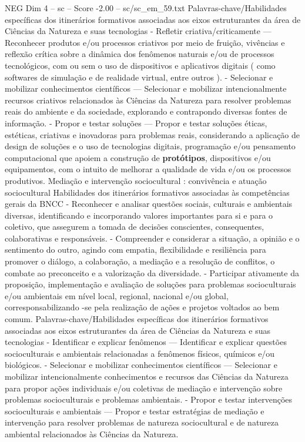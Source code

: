 \begin{textsample}{NEG Dim 4 – sc – Score -2.00 – sc/sc\_em\_59.txt}
Palavras-chave/Habilidades específicas dos itinerários formativos associadas aos eixos estruturantes da área de Ciências da Natureza e suas tecnologias - Refletir criativa/criticamente — Reconhecer produtos e/ou processos criativos por meio de fruição, vivências e reflexão crítica sobre a dinâmica dos fenômenos naturais e/ou de processos tecnológicos, com ou sem o uso de dispositivos e aplicativos digitais ( como softwares de simulação e de realidade virtual, entre outros ). - Selecionar e mobilizar conhecimentos científicos — Selecionar e mobilizar intencionalmente recursos criativos relacionados às Ciências da Natureza para resolver problemas reais do ambiente e da sociedade, explorando e contrapondo diversas fontes de informação. - Propor e testar soluções — Propor e testar soluções éticas, estéticas, criativas e inovadoras para problemas reais, considerando a aplicação de design de soluções e o uso de tecnologias digitais, programação e/ou pensamento computacional que apoiem a construção de \textbf{protótipos}, dispositivos e/ou equipamentos, com o intuito de melhorar a qualidade de vida e/ou os processos produtivos.
Mediação e intervenção sociocultural : convivência e atuação sociocultural Habilidades dos itinerários formativos associadas às competências gerais da BNCC - Reconhecer e analisar questões sociais, culturais e ambientais diversas, identificando e incorporando valores importantes para si e para o coletivo, que assegurem a tomada de decisões conscientes, consequentes, colaborativas e responsáveis. - Compreender e considerar a situação, a opinião e o sentimento do outro, agindo com empatia, flexibilidade e resiliência para promover o diálogo, a colaboração, a mediação e a resolução de conflitos, o combate ao preconceito e a valorização da diversidade. - Participar ativamente da proposição, implementação e avaliação de soluções para problemas socioculturais e/ou ambientais em nível local, regional, nacional e/ou global, corresponsabilizando -se pela realização de ações e projetos voltados ao bem comum.
Palavras-chave/Habilidades específicas dos itinerários formativos associadas aos eixos estruturantes da área de Ciências da Natureza e suas tecnologias - Identificar e explicar fenômenos — Identificar e explicar questões socioculturais e ambientais relacionadas a fenômenos físicos, químicos e/ou biológicos. - Selecionar e mobilizar conhecimentos científicos — Selecionar e mobilizar intencionalmente conhecimentos e recursos das Ciências da Natureza para propor ações individuais e/ou coletivas de mediação e intervenção sobre problemas socioculturais e problemas ambientais. - Propor e testar intervenções socioculturais e ambientais — Propor e testar estratégias de mediação e intervenção para resolver problemas de natureza sociocultural e de natureza ambiental relacionados às Ciências da Natureza.

\end{textsample}
